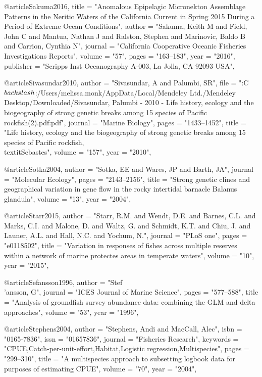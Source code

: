{@article{Sakuma2016,
    title = "{Anomalous Epipelagic Micronekton Assemblage Patterns in the Neritic Waters of the California Current in Spring 2015 During a Period of Extreme Ocean Conditions}",
    author = "{Sakuma, Keith M and Field, John C and Mantua, Nathan J and Ralston, Stephen and Marinovic, Baldo B and Carrion, Cynthia N}",
    journal = "{California Cooperative Oceanic Fisheries Investigations Reports}",
    volume = "{57}",
    pages = "{163--183}",
    year = "{2016}",
    publisher = "{Scripps Inst Oceanography A-003, La Jolla, CA 92093 USA}",
}

@article{Sivasundar2010,
    author = "{Sivasundar, A and Palumbi, SR}",
    file = "{:C$\\backslash$:/Users/melissa.monk/AppData/Local/Mendeley Ltd./Mendeley Desktop/Downloaded/Sivasundar, Palumbi - 2010 - Life history, ecology and the biogeography of strong genetic breaks among 15 species of Pacific rockfish(2).pdf:pdf}",
    journal = "{Marine Biology}",
    pages = "{1433--1452}",
    title = "{{Life history, ecology and the biogeography of strong genetic breaks among 15 species of Pacific rockfish, \\textit{{Sebastes}}}}",
    volume = "{157}",
    year = "{2010}",
}

@article{Sotka2004,
    author = "{Sotka, EE and Wares, JP and Barth, JA}",
    journal = "{Molecular Ecology}",
    pages = "{2143--2156}",
    title = "{{Strong genetic clines and geographical variation in gene flow in the rocky intertidal barnacle Balanus glandula}}",
    volume = "{13}",
    year = "{2004}",
}

@article{Starr2015,
    author = "{Starr, R.M. and Wendt, D.E. and Barnes, C.L. and Marks, C.I. and Malone, D. and Waltz, G. and Schmidt, K.T. and Chiu, J. and Launer, A.L. and Hall, N.C. and Yochum, N.}",
    journal = "{PLoS one}",
    pages = "{e0118502}",
    title = "{{Variation in responses of fishes across multiple reserves within a network of marine protectes areas in temperate waters}}",
    volume = "{10}",
    year = "{2015}",
}

@article{Sefansson1996,
    author = "{Stef\\'{a}nsson, G}",
    journal = "{ICES Journal of Marine Science}",
    pages = "{577--588}",
    title = "{{Analysis of groundfish survey abundance data: combining the GLM and delta approaches}}",
    volume = "{53}",
    year = "{1996}",
}

@article{Stephens2004,
    author = "{Stephens, Andi and MacCall, Alec}",
    isbn = "{0165-7836}",
    issn = "{01657836}",
    journal = "{Fisheries Research}",
    keywords = "{CPUE,Catch-per-unit-effort,Habitat,Logistic regression,Multispecies}",
    pages = "{299--310}",
    title = "{{A multispecies approach to subsetting logbook data for purposes of estimating CPUE}}",
    volume = "{70}",
    year = "{2004}",
}

}
